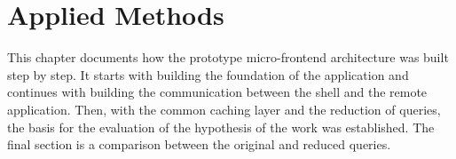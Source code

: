 \chapter{Applied Methods}\label{chapter:applied-methods}

This chapter documents how the prototype micro-frontend architecture was built step by step. It starts with building the foundation of the application and continues with building the communication between the shell and the remote application. Then, with the common caching layer and the reduction of queries, the basis for the evaluation of the hypothesis of the work was established. The final section is a comparison between the original and reduced queries.


%




% 

